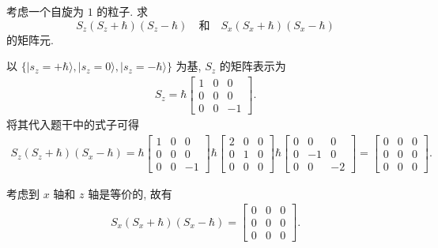 \documentclass{assignment}
\begin{document}
\begin{prob}[课本习题 3.5]
    考虑一个自旋为 $1$ 的粒子. 求
    \[
        S_z(S_z+\hbar)(S_z-\hbar)\quad\text{和}\quad S_x(S_x+\hbar)(S_x-\hbar)
    \]
    的矩阵元.
\end{prob}
\begin{pf}
    以 $\{\lvert s_z=+\hbar\rangle,\lvert s_z=0\rangle,\lvert s_z=-\hbar\rangle\}$ 为基, $S_z$ 的矩阵表示为
    \begin{align}
        S_z=\hbar\begin{bmatrix}
            1&0&0\\
            0&0&0\\
            0&0&-1
        \end{bmatrix}.
    \end{align}
    将其代入题干中的式子可得
    \begin{align}
        S_z(S_z+\hbar)(S_x-\hbar)=\hbar\begin{bmatrix}
            1&0&0\\
            0&0&0\\
            0&0&-1
        \end{bmatrix}\hbar\begin{bmatrix}
            2&0&0\\
            0&1&0\\
            0&0&0
        \end{bmatrix}\hbar\begin{bmatrix}
            0&0&0\\
            0&-1&0\\
            0&0&-2
        \end{bmatrix}=\begin{bmatrix}
            0&0&0\\
            0&0&0\\
            0&0&0
        \end{bmatrix}.
    \end{align}

    考虑到 $x$ 轴和 $z$ 轴是等价的, 故有
    \begin{align}
        S_x(S_x+\hbar)(S_x-\hbar)=\begin{bmatrix}
            0&0&0\\
            0&0&0\\
            0&0&0
        \end{bmatrix}.
    \end{align}
\end{pf}
\end{document}

